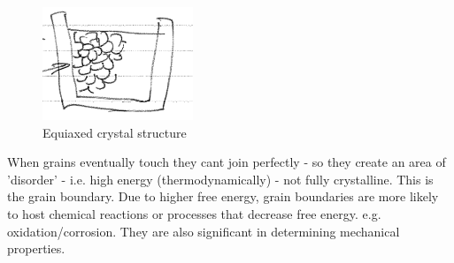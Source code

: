 \documentclass[class=report, crop=false, 12pt,a4paper]{standalone}
\begin{document}
\begin{figure}[h]
  \centering
  \includegraphics[width = 0.4\textwidth]{../img/equiaxed}
  \caption{Equiaxed crystal structure}
  \label{fig:equiaxed}
\end{figure}
When grains eventually touch they cant join perfectly - so they create an area of 'disorder' - i.e. high energy (thermodynamically) - not fully crystalline. This is the grain boundary. Due to higher free energy, grain boundaries are more likely to host chemical reactions or processes that decrease free energy. e.g. oxidation/corrosion. They are also significant in determining mechanical properties. 
\end{document}
